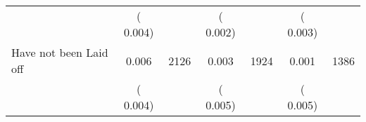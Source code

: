 \begin{tabular}{l*{6}{c}}
                       &       (       0.004)            &                               &       (       0.002)            &                               &       (       0.003)            &                               \\
Have not been Laid off        &              0.006      &       2126       &              0.003      &       1924       &              0.001      &       1386       \\
                       &       (       0.004)            &                               &       (       0.005)            &                               &       (       0.005)            &                               \\
\hline \end{tabular}